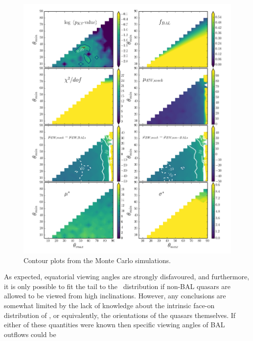 

\begin{figure} %
\centering
\includegraphics[width=1.0\textwidth]{figures/ewpaper/four_ew_o3_max_sdss.png}
\caption
{
Contour plots from the Monte Carlo simulations.
}
\label{fig:contour}
\end{figure} %


As expected, equatorial viewing angles are strongly 
disfavoured, and furthermore, it is only possible to fit
the tail to the \ewo\ distribution if non-BAL quasars are allowed 
to be viewed from high inclinations. However, any conclusions
are somewhat limited by the lack of knowledge about the 
intrinsic face-on distribution of \ewo, or equivalently,
the orientations of the quasars themselves. If either of these
quantities were known then specific viewing angles of
BAL outflows could be 

